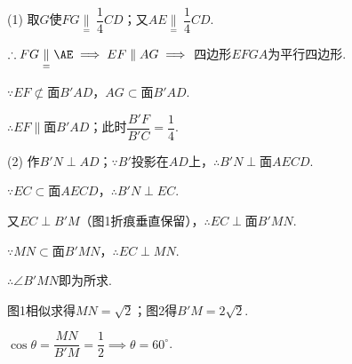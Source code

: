 \documentclass{article}
\begin{document}
(1) 取$G$使$FG\underset{=}{\parallel}\ \dfrac{1}{4}CD$；又$AE\underset{=}{\parallel}\ \dfrac{1}{4}CD$.

$\therefore FG\underset{=}{\parallel}\AE \implies EF\parallel AG \implies$ 四边形$EFGA$为平行四边形.

$\because EF\not\subset$面$B'AD$，$AG\subset$面$B'AD$.

$\therefore EF\parallel$面$B'AD$；此时$\dfrac{B'F}{B'C}=\dfrac{1}{4}$.

(2) 作$B'N\perp AD$；$\because B'$投影在$AD$上，$\therefore B'N\perp$面$AECD$.

$\because EC\subset$面$AECD$，$\therefore B'N\perp EC$.

又$EC\perp B'M$（图1折痕垂直保留），$\therefore EC\perp$面$B'MN$.

$\because MN\subset$面$B'MN$，$\therefore EC\perp MN$.

$\therefore \angle B'MN$即为所求.

图1相似求得$MN=\sqrt{2}$；图2得$B'M=2\sqrt{2}$.

$\cos\theta=\dfrac{MN}{B'M}=\dfrac{1}{2} \implies \theta=60^\circ$.
\end{document}
